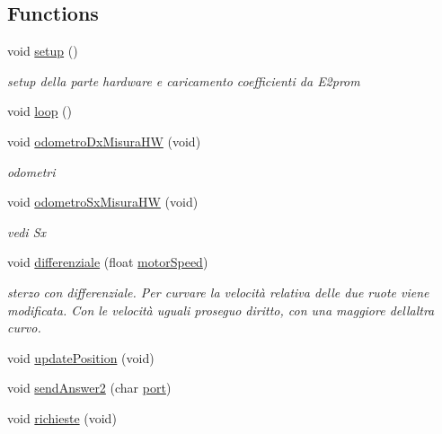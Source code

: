 \subsection*{Functions}
\begin{DoxyCompactItemize}
\item 
void \mbox{\hyperlink{ari_pi__2_d_c__esp__08_8ino_a4fc01d736fe50cf5b977f755b675f11d}{setup}} ()
\begin{DoxyCompactList}\small\item\em setup della parte hardware e caricamento coefficienti da E2prom \end{DoxyCompactList}\item 
void \mbox{\hyperlink{ari_pi__2_d_c__esp__08_8ino_afe461d27b9c48d5921c00d521181f12f}{loop}} ()
\item 
void \mbox{\hyperlink{ari_pi__2_d_c__esp__08_8ino_a6af06b46b74b5a44e1adc270e1e07e6b}{odometro\+Dx\+Misura\+HW}} (void)
\begin{DoxyCompactList}\small\item\em odometri \end{DoxyCompactList}\item 
void \mbox{\hyperlink{ari_pi__2_d_c__esp__08_8ino_aef8d9e68883244c4d12fb9dfb14b0b2e}{odometro\+Sx\+Misura\+HW}} (void)
\begin{DoxyCompactList}\small\item\em vedi Sx \end{DoxyCompactList}\item 
void \mbox{\hyperlink{ari_pi__2_d_c__esp__08_8ino_af117273d2066fa1917036ae9a9742ae7}{differenziale}} (float \mbox{\hyperlink{ari_pi__2_d_c__esp__08_8ino_a8dfd382ee3674a1db48ad2c69bcaaf56}{motor\+Speed}})
\begin{DoxyCompactList}\small\item\em sterzo con differenziale. Per curvare la velocità relativa delle due ruote viene modificata. Con le velocità uguali proseguo diritto, con una maggiore dell\textquotesingle{}altra curvo. \end{DoxyCompactList}\item 
void \mbox{\hyperlink{ari_pi__2_d_c__esp__08_8ino_a1961cf99cc4edb6f9f48ea4b3ec3112c}{update\+Position}} (void)
\item 
void \mbox{\hyperlink{ari_pi__2_d_c__esp__08_8ino_a914ee45b85c8745eaee35cdef279a276}{send\+Answer2}} (char \mbox{\hyperlink{ari_pi__2_d_c__esp__08_8ino_a4b20c17190582b367bfba9b9bd5ea962}{port}})
\item 
void \mbox{\hyperlink{ari_pi__2_d_c__esp__08_8ino_a9d7193cecd4d57fda8e39dc98a236253}{richieste}} (void)

\end{DoxyCompactItemize}
